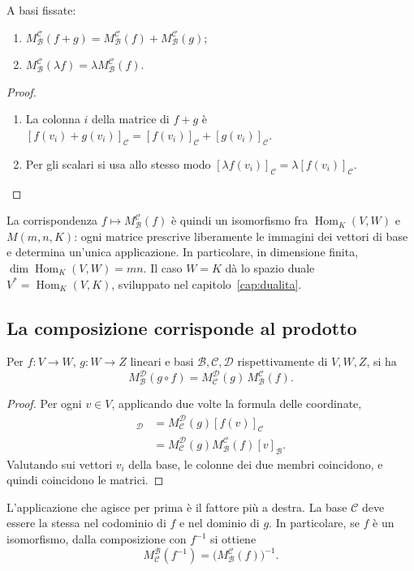 \begin{proposizione}
A basi fissate:
\begin{enumerate}[label=\arabic*.]
\item $M_{\mathcal B}^{\mathcal C}(f+g)=M_{\mathcal B}^{\mathcal C}(f)+M_{\mathcal B}^{\mathcal C}(g)$;
\item $M_{\mathcal B}^{\mathcal C}(\lambda f)=\lambda M_{\mathcal B}^{\mathcal C}(f)$.
\end{enumerate}
\end{proposizione}
\begin{proof}
\begin{enumerate}[label=\arabic*.]
\item La colonna $i$ della matrice di $f+g$ è $[f(v_i)+g(v_i)]_{\mathcal C}=[f(v_i)]_{\mathcal C}+[g(v_i)]_{\mathcal C}$.
\item Per gli scalari si usa allo stesso modo $[\lambda f(v_i)]_{\mathcal C}=\lambda[f(v_i)]_{\mathcal C}$.
\end{enumerate}
\end{proof}
La corrispondenza $f\mapsto M_{\mathcal B}^{\mathcal C}(f)$ è quindi un isomorfismo fra $\operatorname{Hom}_K(V,W)$ e $M(m,n,K)$: ogni matrice prescrive liberamente le immagini dei vettori di base e determina un'unica applicazione. In particolare, in dimensione finita, $\dim\operatorname{Hom}_K(V,W)=mn$. Il caso $W=K$ dà lo spazio duale $V^*=\operatorname{Hom}_K(V,K)$, sviluppato nel capitolo~\ref{cap:dualita}.

\subsection{La composizione corrisponde al prodotto}
\begin{proposizione}
Per $f:V\to W$, $g:W\to Z$ lineari e basi $\mathcal B,\mathcal C,\mathcal D$ rispettivamente di $V,W,Z$, si ha
\[
 M_{\mathcal B}^{\mathcal D}(g\circ f)
 =M_{\mathcal C}^{\mathcal D}(g)\,M_{\mathcal B}^{\mathcal C}(f).
\]
\end{proposizione}
\begin{proof}
Per ogni $v\in V$, applicando due volte la formula delle coordinate,
\begin{align*}
 [(g\circ f)(v)]_{\mathcal D}
 &=M_{\mathcal C}^{\mathcal D}(g)[f(v)]_{\mathcal C}\\
 &=M_{\mathcal C}^{\mathcal D}(g)M_{\mathcal B}^{\mathcal C}(f)[v]_{\mathcal B}.
\end{align*}
Valutando sui vettori $v_i$ della base, le colonne dei due membri coincidono, e quindi coincidono le matrici.
\end{proof}
L'applicazione che agisce per prima è il fattore più a destra. La base $\mathcal C$ deve essere la stessa nel codominio di $f$ e nel dominio di $g$. In particolare, se $f$ è un isomorfismo, dalla composizione con $f^{-1}$ si ottiene
\[
 M_{\mathcal C}^{\mathcal B}(f^{-1})=\bigl(M_{\mathcal B}^{\mathcal C}(f)\bigr)^{-1}.
\]
